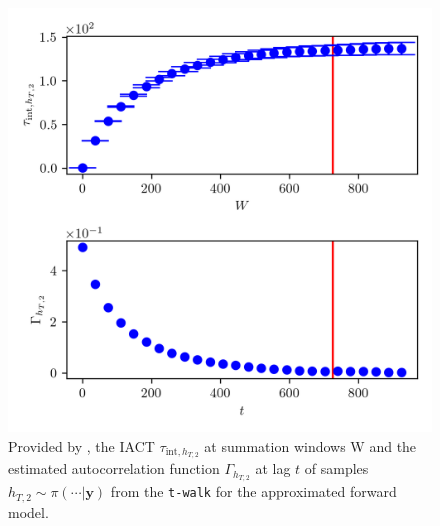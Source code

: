 \begin{figure}[ht!]
	\centering
	\includegraphics{UwerrTauIntTWalk8.png}
	\caption[IACT and autocorrelation function of samples $h_{T,2} \sim \pi(\cdot|\bm{y})$, for approximated model.]{Provided by \cite{drikHesse}, the IACT $\tau_{\text{int},h_{T,2}}$ at summation windows W and the estimated autocorrelation function $\Gamma_{h_{T,2}}$ at lag $t$ of samples $h_{T,2} \sim \pi( \cdots | \bm{y})$ from the \texttt{t-walk} for the approximated forward model.}
	\label{fig:TWalkIATC9}
\end{figure}


